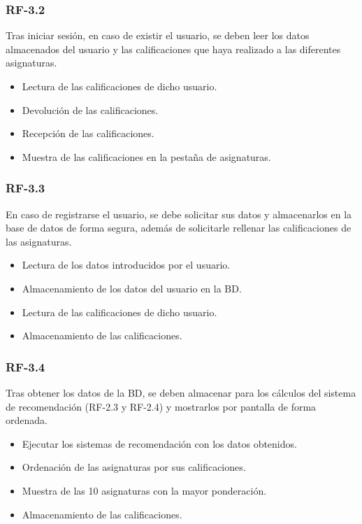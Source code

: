 \subsubsection{RF-3.2}
Tras iniciar sesión, en caso de existir el usuario, se deben leer los datos almacenados del usuario y las calificaciones que haya realizado a las diferentes asignaturas. 
\begin{itemize}
\item Lectura de las calificaciones de dicho usuario. 
\item Devolución de las calificaciones. 
\item Recepción de las calificaciones. 
\item Muestra  de las calificaciones en la pestaña de asignaturas. 
\end{itemize} 

\subsubsection{RF-3.3}
En caso de registrarse el usuario, se debe solicitar sus datos y almacenarlos en la base de datos de forma segura, además de solicitarle rellenar las calificaciones de las asignaturas. 
\begin{itemize}
\item Lectura de los datos introducidos por el usuario. 
\item Almacenamiento de los datos del usuario en la BD.  
\item Lectura de las calificaciones de dicho usuario. 
\item Almacenamiento de las calificaciones.  
\end{itemize} 

\subsubsection{RF-3.4}
Tras obtener los datos de la BD, se deben almacenar para los cálculos del sistema de recomendación (RF-2.3  y RF-2.4) y mostrarlos por pantalla de forma ordenada. 
\begin{itemize}
\item Ejecutar los sistemas de recomendación con los datos obtenidos.  
\item Ordenación de las asignaturas por sus calificaciones. 
\item Muestra de las 10 asignaturas con la mayor ponderación. 
\item Almacenamiento de las calificaciones.  
\end{itemize} 


